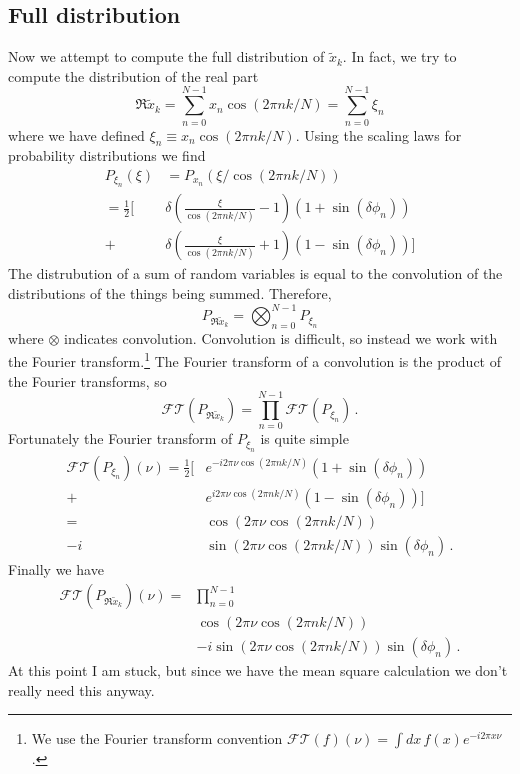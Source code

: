 \subsection{Full distribution}

Now we attempt to compute the full distribution of $\tilde{x}_k$.
In fact, we try to compute the distribution of the real part
\begin{equation}
\Re \tilde{x}_k = \sum_{n=0}^{N-1} x_n \cos(2\pi n k / N) = \sum_{n=0}^{N-1} \xi_n
\end{equation}
where we have defined $\xi_n \equiv x_n \cos(2\pi n k / N)$.
Using the scaling laws for probability distributions we find
\begin{align}
P_{\xi_n}(\xi) &= P_{x_n}(\xi / \cos(2\pi n k / N)) \nonumber \\
= \frac{1}{2} \bigg[ & \delta \left( \frac{\xi}{\cos(2\pi n k / N)} - 1 \right) (1 + \sin(\delta \phi_n)) \nonumber \\
+ & \delta \left( \frac{\xi}{\cos(2 \pi n k / N)} + 1 \right) (1 - \sin(\delta \phi_n)) \bigg]
\end{align}
The distrubution of a sum of random variables is equal to the convolution of the distributions of the things being summed.
Therefore,
\begin{equation}
P_{\Re\tilde{x}_k} = \bigotimes_{n=0}^{N-1} P_{\xi_n}
\end{equation}
where $\otimes$ indicates convolution.
Convolution is difficult, so instead we work with the Fourier transform.\footnote{We use the Fourier transform convention $\mathcal{FT}(f)(\nu) = \int dx \, f(x) e^{-i 2 \pi x \nu}$.}
The Fourier transform of a convolution is the product of the Fourier transforms, so
\begin{equation}
\mathcal{FT}(P_{\Re \tilde{x}_k}) = \prod_{n=0}^{N-1} \mathcal{FT}(P_{\xi_n}) \, .
\end{equation}
Fortunately the Fourier transform of $P_{\xi_n}$ is quite simple
\begin{align}
\mathcal{FT}(P_{\xi_n})(\nu) = \frac{1}{2}
\bigg[
& e^{-i 2 \pi \nu \cos(2\pi n k / N)}(1 + \sin(\delta \phi_n)) \nonumber \\
+ & e^{ i 2 \pi \nu \cos(2\pi n k / N)}(1 - \sin(\delta \phi_n))
\bigg] \nonumber \\
= & \cos(2\pi \nu \cos(2\pi n k / N)) \nonumber \\
- i & \sin(2\pi \nu \cos(2 \pi n k / N))\sin(\delta \phi_n) \, .
\end{align}
Finally we have
\begin{align}
\mathcal{FT}(P_{\Re \tilde{x}_k})(\nu) = & \prod_{n=0}^{N-1} \nonumber \\
& \cos(2 \pi \nu \cos(2 \pi n k / N)) \nonumber \\
& - i \sin(2 \pi \nu \cos(2 \pi n k / N))\sin(\delta \phi_n) \, .
\end{align}
At this point I am stuck, but since we have the mean square calculation we don't really need this anyway.
